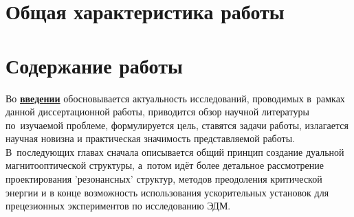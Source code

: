 \section*{Общая характеристика работы}

\newcommand{\actuality}{\pdfbookmark[1]{Актуальность}{actuality}\underline{\textbf{\actualityTXT}}}
\newcommand{\progress}{\pdfbookmark[1]{Разработанность темы}{progress}\underline{\textbf{\progressTXT}}}
\newcommand{\aim}{\pdfbookmark[1]{Цели}{aim}\underline{{\textbf\aimTXT}}}
\newcommand{\tasks}{\pdfbookmark[1]{Задачи}{tasks}\underline{\textbf{\tasksTXT}}}
\newcommand{\aimtasks}{\pdfbookmark[1]{Цели и задачи}{aimtasks}\aimtasksTXT}
\newcommand{\novelty}{\pdfbookmark[1]{Научная новизна}{novelty}\underline{\textbf{\noveltyTXT}}}
\newcommand{\influence}{\pdfbookmark[1]{Практическая значимость}{influence}\underline{\textbf{\influenceTXT}}}
\newcommand{\methods}{\pdfbookmark[1]{Методология и методы исследования}{methods}\underline{\textbf{\methodsTXT}}}
\newcommand{\defpositions}{\pdfbookmark[1]{Положения, выносимые на защиту}{defpositions}\underline{\textbf{\defpositionsTXT}}}
\newcommand{\reliability}{\pdfbookmark[1]{Достоверность}{reliability}\underline{\textbf{\reliabilityTXT}}}
\newcommand{\probation}{\pdfbookmark[1]{Апробация}{probation}\underline{\textbf{\probationTXT}}}
\newcommand{\contribution}{\pdfbookmark[1]{Личный вклад}{contribution}\underline{\textbf{\contributionTXT}}}
\newcommand{\publications}{\pdfbookmark[1]{Публикации}{publications}\underline{\textbf{\publicationsTXT}}}




\section*{Содержание работы}
Во \underline{\textbf{введении}} обосновывается актуальность
исследований, проводимых в~рамках данной диссертационной работы,
приводится обзор научной литературы по~изучаемой проблеме,
формулируется цель, ставятся задачи работы, излагается научная новизна
и практическая значимость представляемой работы. В~последующих главах
сначала описывается общий принцип создание дуальной магнитооптической структуры, а~потом идёт более детальное рассмотрение проектирования 'резонансных' структур, методов преодоления критической энергии и в конце возможность использования ускорительных установок для прецезионных экспериментов по исследованию ЭДМ.

